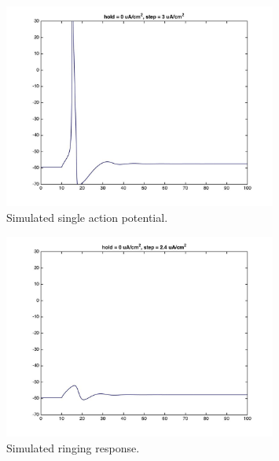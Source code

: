 \documentclass{beamer}
\begin{document}
\begin{frame}
  \begin{figure}
    \centering
    \includegraphics[width = 0.8\textwidth]{./images/current_0_3.jpg}
    \caption{Simulated single action potential.}
  \end{figure}
\end{frame}

\begin{frame}
  \begin{figure}
    \centering
    \includegraphics[width = 0.8\textwidth]{./images/current_0_2p4.jpg}
    \caption{Simulated ringing response.}
  \end{figure}
\end{frame}
\end{document}

